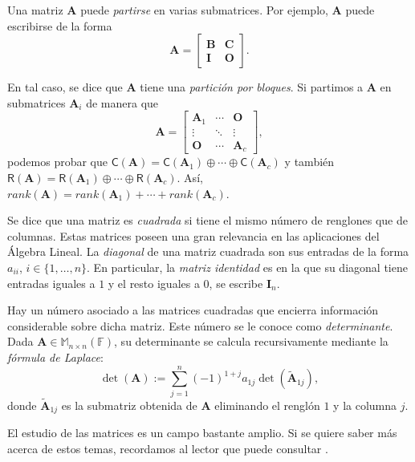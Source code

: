              Una matriz $\mathbf{A}$ puede \textit{partirse} en varias submatrices. Por ejemplo, $\mathbf{A}$ puede escribirse de la forma $$\mathbf{A} = \begin{bmatrix}
            \mathbf{B} & \mathbf{C} \\
            \mathbf{I} & \mathbf{O}
            \end{bmatrix}.$$ 
            
            En tal caso, se dice que $\mathbf{A}$ tiene una \textit{partición por} \textit{bloques}. Si partimos a $\mathbf{A}$ en submatrices $\mathbf{A}_{i}$ de manera que $$\mathbf{A} = \begin{bmatrix}
            \mathbf{A}_{1} & \cdots & \mathbf{O} \\
            \vdots & \ddots & \vdots \\
            \mathbf{O} & \cdots & \mathbf{A}_{c}
            \end{bmatrix},$$ podemos probar que $\mathsf{C}(\mathbf{A}) = \mathsf{C}(\mathbf{A}_{1})\oplus \cdots \oplus \mathsf{C}(\mathbf{A}_{c})$ y también \\ $\mathsf{R}(\mathbf{A}) = \mathsf{R}(\mathbf{A}_{1})\oplus \cdots \oplus \mathsf{R}(\mathbf{A}_{c})$. Así, $rank(\mathbf{A}) = rank(\mathbf{A}_{1})+ \cdots + rank(\mathbf{A}_{c})$.
            
            Se dice que una matriz es \textit{cuadrada} si tiene el mismo número de renglones que de columnas. Estas matrices poseen una gran relevancia en las aplicaciones del Álgebra Lineal. La \textit{diagonal} de una matriz cuadrada son sus entradas de la forma $a_{ii}$, $i \in \{1, \ldots, n\}$. En particular, la \textit{matriz identidad} es en la que su diagonal tiene entradas iguales a $1$ y el resto iguales a $0$, se escribe $\mathbf{I}_{n}$. 
            
            Hay un número asociado a las matrices cuadradas que encierra información considerable sobre dicha matriz. Este número se le conoce como \textit{determinante}. Dada $\mathbf{A} \in \mathbb{M}_{n \times n} (\mathbb{F})$, su determinante se calcula recursivamente mediante la \textit{fórmula de Laplace}:
            $$
            \det(\mathbf{A}):= \sum_{j=1}^{n} (-1)^{1+j} a_{1j} \det(\widetilde{\mathbf{A}}_{1j}),
            $$ donde $\widetilde{\mathbf{A}}_{1j}$ es la submatriz obtenida de $\mathbf{A}$ eliminando el renglón $1$ y la columna $j$.
            
            El estudio de las matrices es un campo bastante amplio. Si se quiere saber más acerca de estos temas, recordamos al lector que puede consultar  \cite{Friedberg,Noble,Zhang, Shores}.



